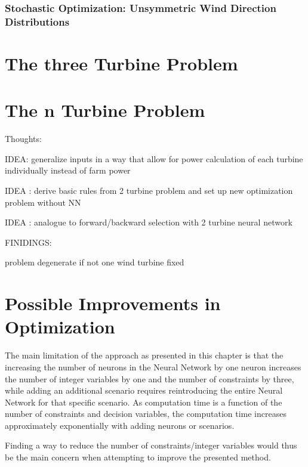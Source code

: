 \subsubsection{Stochastic Optimization: Unsymmetric Wind Direction Distributions}


\section{The three Turbine Problem}

\section{The n Turbine Problem}

Thoughts: 

IDEA: generalize inputs in a way that allow for power calculation of each turbine individually instead of farm power

IDEA : derive basic rules from 2 turbine problem and set up new optimization problem without NN 

IDEA : analogue to forward/backward selection with 2 turbine neural network


FINIDINGS: 

problem degenerate if not one wind turbine fixed

\section{Possible Improvements in Optimization}

The main limitation of the approach as presented in this chapter is that the increasing the number of neurons in the Neural Network by one neuron increases the number of integer variables by one and the number of constraints by three, while adding an additional scenario requires reintroducing the entire Neural Network for that specific scenario. As computation time is a function of the number of constraints and decision variables, the computation time increases approximately exponentially with adding neurons or scenarios. 

Finding a way to reduce the number of constraints/integer variables would thus be the main concern when attempting to improve the presented method. 
